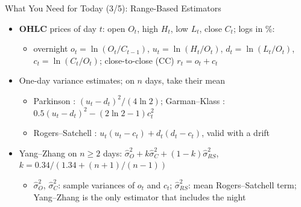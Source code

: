 \begin{frame}{What You Need for Today (3/5): Range-Based Estimators}
\itemsize{\small}
\begin{itemize}
    \item \textbf{OHLC} prices of day $t$: open $O_t$, high $H_t$, low $L_t$, close $C_t$; logs in \%:
    \begin{itemize}
        \item overnight $o_t = \ln(O_t/C_{t-1})$, $u_t = \ln(H_t/O_t)$, $d_t = \ln(L_t/O_t)$, $c_t = \ln(C_t/O_t)$; close-to-close (CC) $r_t = o_t + c_t$
    \end{itemize}
    \item One-day variance estimates; on $n$ days, take their mean
    \begin{itemize}
        \item Parkinson : $(u_t - d_t)^2/(4\ln 2)$; Garman--Klass : $0.5(u_t - d_t)^2 - (2\ln 2 - 1)c_t^2$
        \item Rogers--Satchell : $u_t(u_t - c_t) + d_t(d_t - c_t)$, valid with a drift
    \end{itemize}
    \item Yang--Zhang  on $n \ge 2$ days: $\hat\sigma_O^2 + k\hat\sigma_C^2 + (1-k)\hat\sigma_{RS}^2$, $k = 0.34/(1.34 + (n+1)/(n-1))$
    \begin{itemize}
        \item $\hat\sigma_O^2$, $\hat\sigma_C^2$: sample variances of $o_t$ and $c_t$; $\hat\sigma_{RS}^2$: mean Rogers--Satchell term; Yang--Zhang is the only estimator that includes the night
    \end{itemize}
\end{itemize}
\end{frame}

